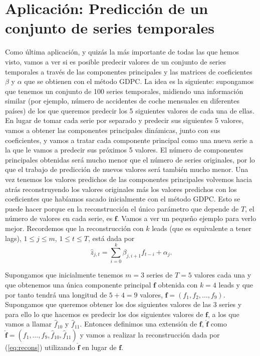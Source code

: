 \newpage

\newpage

\section{Aplicación: Predicción de un conjunto de series temporales}

Como última aplicación, y quizás la más importante de todas las que hemos visto, vamos a ver si es posible predecir valores de un conjunto de series temporales a través de las componentes principales y las matrices de coeficientes $\beta$ y $\alpha$ que se obtienen con el método GDPC. La idea es la siguiente: supongamos que tenemos un conjunto de 100 series temporales, midiendo una información similar (por ejemplo, número de accidentes de coche mensuales en diferentes países) de los que queremos predecir los 5 siguientes valores de cada una de ellas. En lugar de tomar cada serie por separado y predecir sus siguientes 5 valores, vamos a obtener las componentes principales dinámicas, junto con sus coeficientes, y vamos a tratar cada componente principal como una nueva serie a la que le vamos a predecir sus próximos 5 valores. El número de componentes principales obtenidas será mucho menor que el número de series originales, por lo que el trabajo de predicción de nuevos valores será también mucho menor. Una vez tenemos los valores predichos de las componentes principales volvemos hacia atrás reconstruyendo los valores originales más los valores predichos con los coeficientes que habíamos sacado inicialmente con el método GDPC. Esto se puede hacer porque en la reconstrucción el único parámetro que depende de $T$, el número de valores en cada serie, es $\mathbf{f}$. Vamos a ver un pequeño ejemplo para verlo mejor. Recordemos que la reconstrucción con $k$ leads (que es equivalente a tener lags), $1 \leq j \leq m$, $1 \leq t \leq T$, está dada por
\begin{equation}\label{eq:recons}
	\widehat{z}_{j,t} = \sum_{i=0}^k \beta_{j,i+1}f_{t-i} + \alpha_j.
\end{equation}

Supongamos que inicialmente tenemos $m=3$ series de $T=5$ valores cada una y que obtenemos una única componente principal $\mathbf{f}$ obtenida con $k=4$ leads y que por tanto tendrá una longitud de $5+4=9$ valores, $\mathbf{f} = (f_1, f_2, \dots, f_9)$. Supongamos que queremos obtener los dos siguientes valores de las 3 series y para ello lo que hacemos es predecir los dos siguientes valores de $\mathbf{f}$, a los que vamos a llamar $\widehat{f}_{10}$ y $\widehat{f}_{11}$. Entonces definimos una extensión de $\mathbf{f}$, $\mathbf{\widehat{f}}$ como $\mathbf{\widehat{f}} = (f_1, \dots, f_9, \widehat{f}_{10}, \widehat{f}_{11})$ y vamos a realizar la reconstrucción dada por (\ref{eq:recons}) utilizando $\mathbf{\widehat{f}}$ en lugar de $\mathbf{f}$.\\

